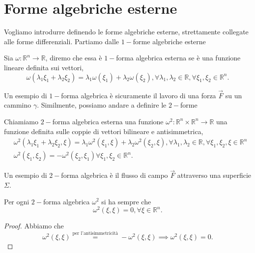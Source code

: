 \section{Forme algebriche esterne}
Vogliamo introdurre definendo le forme algebriche esterne, strettamente collegate alle forme differenziali. Partiamo dalle $1-$forme algebriche esterne
\begin{definition}
    Sia $\omega : \mathbb{R}^n \to \mathbb{R}$, diremo che essa è $1-$forma algebrica esterna se è una funzione lineare definita sui vettori,
    $$
    \omega(\lambda_1 \xi_1 + \lambda_2 \xi_2) = \lambda_1 \omega(\xi_1) + \lambda_2 \omega(\xi_2), \forall \lambda_1, \lambda_2 \in \mathbb{R}, \forall \xi_1, \xi_2 \in \mathbb{R}^n.
    $$
\end{definition}
Un esempio di $1-$forma algebrica è sicuramente il lavoro di una forza $\vec{F}$ su un cammino $\gamma$. Similmente, possiamo andare a definire le $2-$forme
\begin{definition}
    Chiamiamo $2-$forma algebrica esterna una funzione $\omega^2: \mathbb{R}^n \times \mathbb{R}^n \to \mathbb{R}$ una funzione definita sulle coppie di vettori bilineare e antisimmetrica,
    \begin{align*}
        &\omega^2(\lambda_1 \xi_1 + \lambda_2 \xi_2, \xi) = \lambda_1 \omega^2(\xi_1, \xi) + \lambda_2 \omega^2(\xi_2, \xi), \forall \lambda_1, \lambda_2 \in \mathbb{R}, \forall \xi_1, \xi_2, \xi \in \mathbb{R}^n \\
        &\omega^2(\xi_1, \xi_2) = - \omega^2(\xi_2, \xi_1) \forall \xi_1, \xi_2 \in \mathbb{R}^n.
    \end{align*}
\end{definition}
Un esempio di $2-$forma algebrica è il flusso di campo $\vec{F}$ attraverso una superficie $\Sigma$.
\begin{prop}
    Per ogni $2-$forma algebrica $\omega^2$ si ha sempre che
    $$
    \omega^2(\xi, \xi) = 0, \forall \xi \in \mathbb{R}^n.
    $$
\end{prop}
\begin{proof}
    Abbiamo che
    $$
    \omega^2(\xi, \xi) \stackrel{\text{per l'antisimmetricità}}{=} - \omega^2(\xi, \xi) \implies \omega^2(\xi, \xi) = 0.
    $$
\end{proof}

